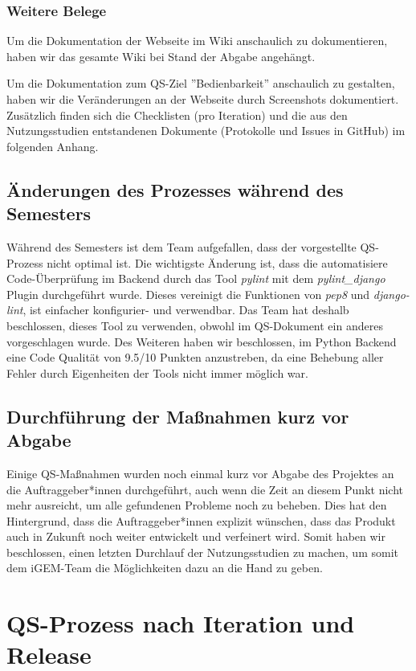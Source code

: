 \documentclass[accentcolor=tud0b,12pt,paper=a4]{tudreport}
\begin{document}
\subsection{Weitere Belege}
Um die Dokumentation der Webseite im Wiki anschaulich zu dokumentieren, haben wir das gesamte Wiki bei Stand der Abgabe angehängt.

Um die Dokumentation zum QS-Ziel ''Bedienbarkeit'' anschaulich zu gestalten, haben wir die Veränderungen an der Webseite durch Screenshots dokumentiert. Zusätzlich finden sich die Checklisten (pro Iteration) und die aus den Nutzungsstudien entstandenen Dokumente (Protokolle und Issues in GitHub) im folgenden Anhang.

\section{Änderungen des Prozesses während des Semesters}
Während des Semesters ist dem Team aufgefallen, dass der vorgestellte QS-Prozess nicht optimal ist. Die wichtigste Änderung ist, dass die automatisiere Code-Überprüfung im Backend durch das Tool \emph{pylint} mit dem \emph{pylint\_django} Plugin durchgeführt wurde. Dieses vereinigt die Funktionen von \emph{pep8} und \emph{django-lint}, ist einfacher konfigurier- und verwendbar. Das Team hat deshalb beschlossen, dieses Tool zu verwenden, obwohl im QS-Dokument ein anderes vorgeschlagen wurde. Des Weiteren haben wir beschlossen, im Python Backend eine Code Qualität von 9.5/10 Punkten anzustreben, da eine Behebung aller Fehler durch Eigenheiten der Tools nicht immer möglich war.

\section{Durchführung der Maßnahmen kurz vor Abgabe}
Einige QS-Maßnahmen wurden noch einmal kurz vor Abgabe des Projektes an die Auftraggeber*innen durchgeführt, auch wenn die Zeit an diesem Punkt nicht mehr ausreicht, um alle gefundenen Probleme noch zu beheben. Dies hat den Hintergrund, dass die Auftraggeber*innen explizit wünschen, dass das Produkt auch in Zukunft noch weiter entwickelt und verfeinert wird. Somit haben wir beschlossen, einen letzten Durchlauf der Nutzungsstudien zu machen, um somit dem iGEM-Team die Möglichkeiten dazu an die Hand zu geben.


\chapter{QS-Prozess nach Iteration und Release}













\end{document}
